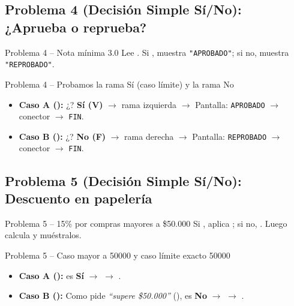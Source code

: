 \documentclass[11pt,letterpaper]{article}
\begin{document}
\subsection{Problema 4 (Decisión Simple Sí/No): ¿Aprueba o reprueba?}
\begin{analisis}{Problema 4 -- Nota mínima 3.0}
Lee . Si , muestra \texttt{"APROBADO"}; si no, muestra \texttt{"REPROBADO"}.
\end{analisis}


\begin{pruebaescritorio}{Problema 4 -- Probamos la rama Sí (caso límite) y la rama No}
\begin{itemize}
  \item \textbf{Caso A ():} ¿? \textbf{Sí (V)} $\rightarrow$ rama izquierda $\rightarrow$ Pantalla: \texttt{APROBADO} $\rightarrow$ conector $\rightarrow$ \texttt{FIN}.
  \item \textbf{Caso B ():} ¿? \textbf{No (F)} $\rightarrow$ rama derecha $\rightarrow$ Pantalla: \texttt{REPROBADO} $\rightarrow$ conector $\rightarrow$ \texttt{FIN}.
\end{itemize}
\end{pruebaescritorio}

\subsection{Problema 5 (Decisión Simple Sí/No): Descuento en papelería}
\begin{analisis}{Problema 5 -- 15\% por compras mayores a \$50.000}
Si , aplica ; si no, . Luego calcula  y muéstralos.
\end{analisis}


\begin{pruebaescritorio}{Problema 5 -- Caso mayor a 50000 y caso límite exacto 50000}
\begin{itemize}
  \item \textbf{Caso A ():}  es \textbf{Sí} $\rightarrow$  $\rightarrow$ .
  \item \textbf{Caso B ():} Como pide \textit{``supere \$50.000''} (\codigo{>}),  es \textbf{No} $\rightarrow$  $\rightarrow$ .
\end{itemize}
\end{pruebaescritorio}
\end{document}
